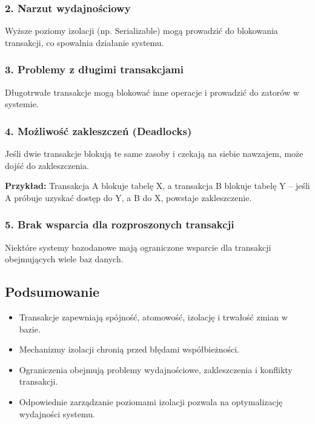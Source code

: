 \subsubsection{2. Narzut wydajnościowy}
Wyższe poziomy izolacji (np. Serializable) mogą prowadzić do blokowania transakcji, co spowalnia działanie systemu.

\subsubsection{3. Problemy z długimi transakcjami}
Długotrwałe transakcje mogą blokować inne operacje i prowadzić do zatorów w systemie.

\subsubsection{4. Możliwość zakleszczeń (Deadlocks)}
Jeśli dwie transakcje blokują te same zasoby i czekają na siebie nawzajem, może dojść do zakleszczenia.

\textbf{Przykład:}  
Transakcja A blokuje tabelę X, a transakcja B blokuje tabelę Y – jeśli A próbuje uzyskać dostęp do Y, a B do X, powstaje zakleszczenie.

\subsubsection{5. Brak wsparcia dla rozproszonych transakcji}
Niektóre systemy bazodanowe mają ograniczone wsparcie dla transakcji obejmujących wiele baz danych.

\subsection{Podsumowanie}
\begin{itemize}
    \item Transakcje zapewniają spójność, atomowość, izolację i trwałość zmian w bazie.
    \item Mechanizmy izolacji chronią przed błędami współbieżności.
    \item Ograniczenia obejmują problemy wydajnościowe, zakleszczenia i konflikty transakcji.
    \item Odpowiednie zarządzanie poziomami izolacji pozwala na optymalizację wydajności systemu.
\end{itemize}
